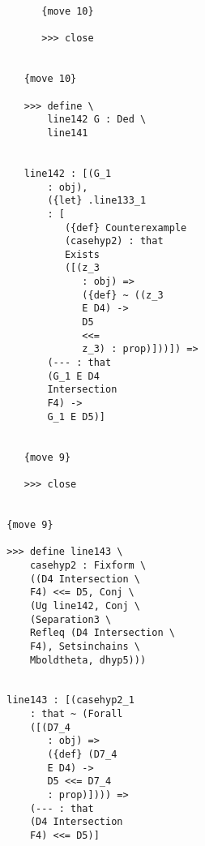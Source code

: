 \documentclass[12pt]{article}
\begin{document}
\begin{verbatim}
                                 {move 10}

                                 >>> close


                              {move 10}

                              >>> define \
                                  line142 G : Ded \
                                  line141


                              line142 : [(G_1 
                                  : obj), 
                                  ({let} .line133_1 
                                  : [
                                     ({def} Counterexample 
                                     (casehyp2) : that 
                                     Exists 
                                     ([(z_3 
                                        : obj) => 
                                        ({def} ~ ((z_3 
                                        E D4) -> 
                                        D5 
                                        <<= 
                                        z_3) : prop)]))]) => 
                                  (--- : that 
                                  (G_1 E D4 
                                  Intersection 
                                  F4) -> 
                                  G_1 E D5)]


                              {move 9}

                              >>> close


                           {move 9}

                           >>> define line143 \
                               casehyp2 : Fixform \
                               ((D4 Intersection \
                               F4) <<= D5, Conj \
                               (Ug line142, Conj \
                               (Separation3 \
                               Refleq (D4 Intersection \
                               F4), Setsinchains \
                               Mboldtheta, dhyp5)))


                           line143 : [(casehyp2_1 
                               : that ~ (Forall 
                               ([(D7_4 
                                  : obj) => 
                                  ({def} (D7_4 
                                  E D4) -> 
                                  D5 <<= D7_4 
                                  : prop)]))) => 
                               (--- : that 
                               (D4 Intersection 
                               F4) <<= D5)]



\end{verbatim}
\end{document}
